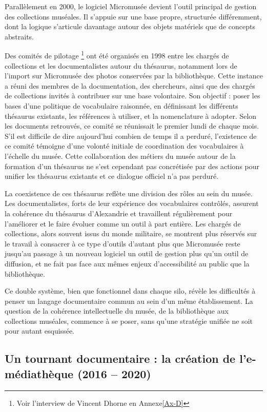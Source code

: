 Parallèlement en 2000, le logiciel Micromusée devient l’outil principal de gestion des collections muséales. Il s’appuie sur une base propre, structurée différemment, dont la logique s’articule davantage autour des objets matériels que de concepts abstraits. 

Des comités de pilotage \footnote{Voir l'interview de Vincent Dhorne en Annexe\ref{Ax-D}}  ont été organisés en 1998 entre les chargés de collections et les documentalistes autour du thésaurus, notamment lors de l'import sur Micromusée des photos conservées par la bibliothèque. Cette instance a réuni des membres de la documentation, des chercheurs, ainsi que des chargés de collections invités à contribuer sur une base volontaire. Son objectif : poser les bases d’une politique de vocabulaire raisonnée, en définissant les différents thésaurus existants, les références à utiliser, et la nomenclature à adopter. Selon les documents retrouvés, ce comité se réunissait le premier lundi de chaque mois. S’il est difficile de dire aujourd’hui combien de temps il a perduré, l'existence de ce comité témoigne d’une volonté initiale de coordination des vocabulaires à l’échelle du musée. Cette collaboration des métiers du musée autour de la formation d'un thésaurus ne s'est cependant pas concrétisée par des actions pour unifier les thésaurus existants et ce dialogue officiel n'a pas perduré.

La coexistence de ces thésaurus reflète une division des rôles au sein du musée. Les documentalistes, forts de leur expérience des vocabulaires contrôlés, assurent la cohérence du thésaurus d'Alexandrie et travaillent régulièrement pour l'améliorer et le faire évoluer comme un outil à part entière. Les chargés de collections, alors souvent issus du monde militaire, se montrent plus réservés sur le travail à consacrer à ce type d'outils d'autant plus que Micromusée reste jusqu'au passage à un nouveau logiciel un outil de gestion plus qu’un outil de diffusion, et ne fait pas face aux mêmes enjeux d'accessibilité au public que la bibliothèque.

Ce double système, bien que fonctionnel dans chaque silo, révèle les difficultés à penser un langage documentaire commun au sein d’un même établissement. La question de la cohérence intellectuelle du musée, de la bibliothèque aux collections muséales, commence à se poser, sans qu'une stratégie unifiée ne soit pour autant esquissée.

\subsection{Un tournant documentaire : la création de l’e-médiathèque (2016 – 2020)}

